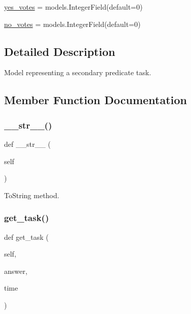 \begin{DoxyCompactItemize}
\mbox{\hyperlink{classjoinapp_1_1models_1_1task__management__models_1_1_sec_pred_task_ab50f50bde4c2c1524460c48def8f27f3}{yes\+\_\+votes}} = models.\+Integer\+Field(default=0)
\item 
\mbox{\hyperlink{classjoinapp_1_1models_1_1task__management__models_1_1_sec_pred_task_a1e1b32e1e9767af8d38c4e2de888919f}{no\+\_\+votes}} = models.\+Integer\+Field(default=0)
\end{DoxyCompactItemize}


\subsection{Detailed Description}
Model representing a secondary predicate task. 

\subsection{Member Function Documentation}
\mbox{\label{classjoinapp_1_1models_1_1task__management__models_1_1_sec_pred_task_a23e8041ce1015febe4fdace3225714f9}} 
\subsubsection{\texorpdfstring{\_\_str\_\_()}{\_\_str\_\_()}}
{\footnotesize\ttfamily def \+\_\+\+\_\+str\+\_\+\+\_\+ (\begin{DoxyParamCaption}\item[{}]{self }\end{DoxyParamCaption})}



To\+String method. 

\mbox{\label{classjoinapp_1_1models_1_1task__management__models_1_1_sec_pred_task_a5c2eb6f87a32af834dd29469a6189f0c}} 
\subsubsection{\texorpdfstring{get\_task()}{get\_task()}}
{\footnotesize\ttfamily def get\+\_\+task (\begin{DoxyParamCaption}\item[{}]{self,  }\item[{}]{answer,  }\item[{}]{time }\end{DoxyParamCaption})}



